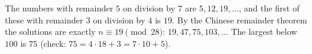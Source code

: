 The numbers with remainder $5$ on division by $7$ are $5,12,19,\dots$, and the first of these with remainder $3$ on division by $4$ is $19$. By the Chinese remainder theorem the solutions are exactly $n\equiv19\pmod{28}$: $19,47,75,103,\dots$ The largest below $100$ is $\boxed{75}$ (check: $75=4\cdot18+3=7\cdot10+5$).
